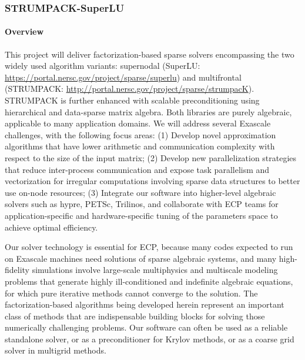 \newcommand{\ignore}[1]{}

\subsubsection{ STRUMPACK-SuperLU} \label{subsubsect:strumpack}

\paragraph{Overview} 
This project will deliver factorization-based sparse solvers
encompassing the two widely used algorithm variants: supernodal
(SuperLU: \url{https://portal.nersc.gov/project/sparse/superlu})
and multifrontal (STRUMPACK: \url{http://portal.nersc.gov/project/sparse/strumpacK}).
STRUMPACK is
further enhanced with scalable preconditioning using
hierarchical and data-sparse matrix algebra. Both libraries are purely algebraic,
applicable to many application domains. We will address
several Exascale challenges, with the following
focus areas: 
(1) Develop novel approximation algorithms that have lower
arithmetic and communication complexity with respect to the size of the
input matrix;
(2) Develop new parallelization strategies that reduce
inter-process communication and expose task parallelism and vectorization
for irregular computations involving sparse data structures to better
use on-node resources;
(3) Integrate our software into higher-level
algebraic solvers such as hypre, PETSc, Trilinos, and collaborate with
ECP teams for application-specific and hardware-specific tuning
of the parameters space to achieve optimal efficiency.

Our solver technology is essential for ECP, because many 
codes expected to run on Exascale machines need
solutions of sparse algebraic systems, and many high-fidelity simulations
involve large-scale multiphysics and multiscale modeling problems that
generate highly ill-conditioned and indefinite algebraic equations,
for which pure iterative methods 
cannot converge to the solution.
The factorization-based algorithms being developed herein
represent an important class of methods that are indispensable building
blocks for solving those numerically challenging problems. Our software
can often be used as a reliable standalone solver, or as a preconditioner
for Krylov methods, or as a coarse grid solver in multigrid
methods. %

